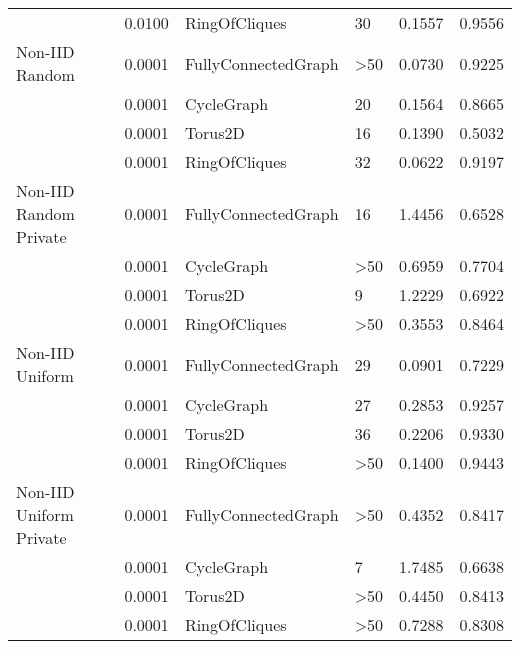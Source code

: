 \begin{tabular}{llllrr}
                        & 0.0100 &        RingOfCliques &          30 &           0.1557 &              0.9556 \\
Non-IID Random  & 0.0001 &  FullyConnectedGraph &         >50 &           0.0730 &              0.9225 \\
                        & 0.0001 &           CycleGraph &          20 &           0.1564 &              0.8665 \\
                        & 0.0001 &              Torus2D &          16 &           0.1390 &              0.5032 \\
                        & 0.0001 &        RingOfCliques &          32 &           0.0622 &              0.9197 \\
Non-IID Random Private & 0.0001 &  FullyConnectedGraph &          16 &           1.4456 &              0.6528 \\
                        & 0.0001 &           CycleGraph &         >50 &           0.6959 &              0.7704 \\
                        & 0.0001 &              Torus2D &           9 &           1.2229 &              0.6922 \\
                        & 0.0001 &        RingOfCliques &         >50 &           0.3553 &              0.8464 \\
Non-IID Uniform  & 0.0001 &  FullyConnectedGraph &          29 &           0.0901 &              0.7229 \\
                        & 0.0001 &           CycleGraph &          27 &           0.2853 &              0.9257 \\
                        & 0.0001 &              Torus2D &          36 &           0.2206 &              0.9330 \\
                        & 0.0001 &        RingOfCliques &         >50 &           0.1400 &              0.9443 \\
Non-IID Uniform Private & 0.0001 &  FullyConnectedGraph &         >50 &           0.4352 &              0.8417 \\
                        & 0.0001 &           CycleGraph &           7 &           1.7485 &              0.6638 \\
                        & 0.0001 &              Torus2D &         >50 &           0.4450 &              0.8413 \\
                        & 0.0001 &        RingOfCliques &         >50 &           0.7288 &              0.8308 \\
\bottomrule
\end{tabular}
